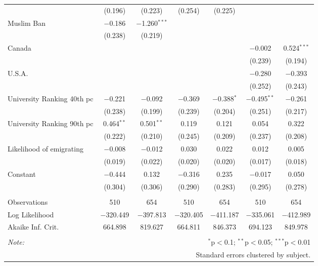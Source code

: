 \begin{sidewaystable}[!htbp]
\begin{tabular}{@{\extracolsep{5pt}}lcccccc}
  & (0.196) & (0.223) & (0.254) & (0.225) &  &  \\ 
  Muslim Ban & $-$0.186 & $-$1.260$^{***}$ &  &  &  &  \\ 
  & (0.238) & (0.219) &  &  &  &  \\ 
  Canada &  &  &  &  & $-$0.002 & 0.524$^{***}$ \\ 
  &  &  &  &  & (0.239) & (0.194) \\ 
  U.S.A. &  &  &  &  & $-$0.280 & $-$0.393 \\ 
  &  &  &  &  & (0.252) & (0.243) \\ 
  University Ranking 40th pc & $-$0.221 & $-$0.092 & $-$0.369 & $-$0.388$^{*}$ & $-$0.495$^{**}$ & $-$0.261 \\ 
  & (0.238) & (0.199) & (0.239) & (0.204) & (0.251) & (0.217) \\ 
  University Ranking 90th pc & 0.464$^{**}$ & 0.501$^{**}$ & 0.119 & 0.121 & 0.054 & 0.322 \\ 
  & (0.222) & (0.210) & (0.245) & (0.209) & (0.237) & (0.208) \\ 
  Likelihood of emigrating & $-$0.008 & $-$0.012 & 0.030 & 0.022 & 0.012 & 0.005 \\ 
  & (0.019) & (0.022) & (0.020) & (0.020) & (0.017) & (0.018) \\ 
  Constant & $-$0.444 & 0.132 & $-$0.316 & 0.235 & $-$0.017 & 0.050 \\ 
  & (0.304) & (0.306) & (0.290) & (0.283) & (0.295) & (0.278) \\ 
 \hline \\[-1.8ex] 
Observations & 510 & 654 & 510 & 654 & 510 & 654 \\ 
Log Likelihood & $-$320.449 & $-$397.813 & $-$320.405 & $-$411.187 & $-$335.061 & $-$412.989 \\ 
Akaike Inf. Crit. & 664.898 & 819.627 & 664.811 & 846.373 & 694.123 & 849.978 \\ 
\hline 
\hline \\[-1.8ex] 
\textit{Note:}  & \multicolumn{6}{r}{$^{*}$p$<$0.1; $^{**}$p$<$0.05; $^{***}$p$<$0.01} \\ 
 & \multicolumn{6}{r}{Standard errors clustered by subject.} \\ 
\end{tabular} 
\end{sidewaystable} 
